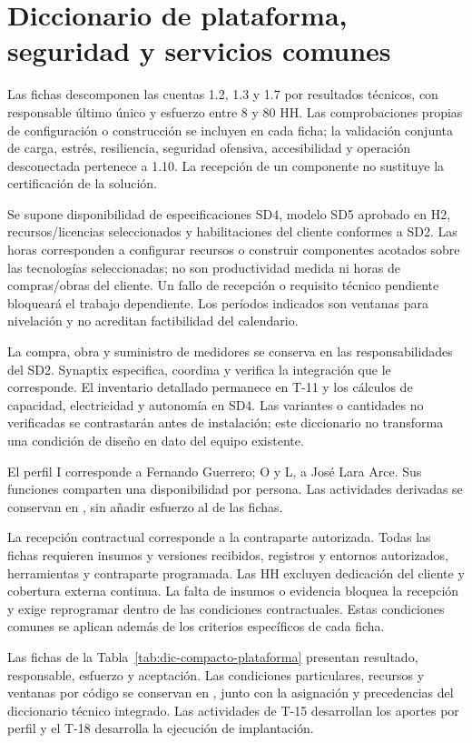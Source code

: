 \section{Diccionario de plataforma, seguridad y servicios comunes}
Las fichas descomponen las cuentas 1.2, 1.3 y 1.7 por resultados técnicos, con responsable último único y esfuerzo entre 8 y 80 HH. Las comprobaciones propias de configuración o construcción se incluyen en cada ficha; la validación conjunta de carga, estrés, resiliencia, seguridad ofensiva, accesibilidad y operación desconectada pertenece a 1.10. La recepción de un componente no sustituye la certificación de la solución.

Se supone disponibilidad de especificaciones SD4, modelo SD5 aprobado en H2, recursos/licencias seleccionados y habilitaciones del cliente conformes a SD2. Las horas corresponden a configurar recursos o construir componentes acotados sobre las tecnologías seleccionadas; no son productividad medida ni horas de compras/obras del cliente. Un fallo de recepción o requisito técnico pendiente bloqueará el trabajo dependiente. Los períodos indicados son ventanas para nivelación y no acreditan factibilidad del calendario.

La compra, obra y suministro de medidores se conserva en las responsabilidades del SD2. Synaptix especifica, coordina y verifica la integración que le corresponde. El inventario detallado permanece en T-11 y los cálculos de capacidad, electricidad y autonomía en SD4. Las variantes o cantidades no verificadas se contrastarán antes de instalación; este diccionario no transforma una condición de diseño en dato del equipo existente.

El perfil I corresponde a Fernando Guerrero; O y L, a José Lara Arce. Sus funciones comparten una disponibilidad por persona. Las actividades derivadas se conservan en , sin añadir esfuerzo al de las fichas.

La recepción contractual corresponde a la contraparte autorizada. Todas las fichas requieren insumos y versiones recibidos, registros y entornos autorizados, herramientas y contraparte programada. Las HH excluyen dedicación del cliente y cobertura externa continua. La falta de insumos o evidencia bloquea la recepción y exige reprogramar dentro de las condiciones contractuales. Estas condiciones comunes se aplican además de los criterios específicos de cada ficha.

Las fichas de la Tabla~\ref{tab:dic-compacto-plataforma} presentan resultado, responsable, esfuerzo y aceptación. Las condiciones particulares, recursos y ventanas por código se conservan en , junto con la asignación y precedencias del diccionario técnico integrado. Las actividades de T-15 desarrollan los aportes por perfil y el T-18 desarrolla la ejecución de implantación.


